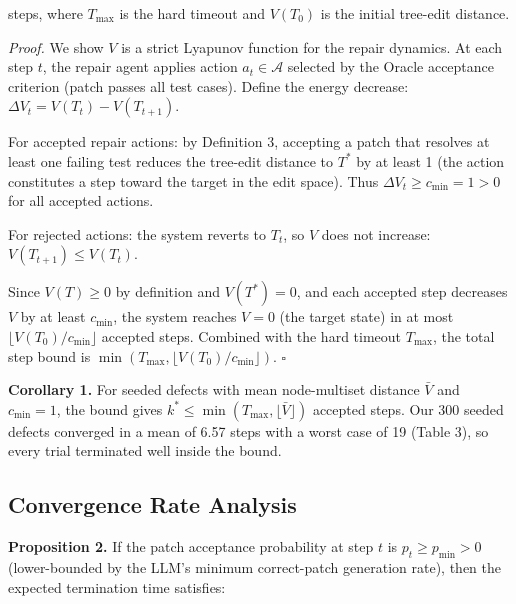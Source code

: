\documentclass[10pt,twocolumn,letterpaper]{article}
\begin{document}
steps, where $T_{\max}$ is the hard timeout and $V(T_0)$ is the initial tree-edit distance.

\textit{Proof.} We show $V$ is a strict Lyapunov function for the repair dynamics. At each step $t$, the repair agent applies action $a_t \in \mathcal{A}$ selected by the Oracle acceptance criterion (patch passes all test cases). Define the energy decrease: $\Delta V_t = V(T_t) - V(T_{t+1})$.

For accepted repair actions: by Definition 3, accepting a patch that resolves at least one failing test reduces the tree-edit distance to $T^*$ by at least 1 (the action constitutes a step toward the target in the edit space). Thus $\Delta V_t \geq c_{\min} = 1 > 0$ for all accepted actions.

For rejected actions: the system reverts to $T_t$, so $V$ does not increase: $V(T_{t+1}) \leq V(T_t)$.

Since $V(T) \geq 0$ by definition and $V(T^*) = 0$, and each accepted step decreases $V$ by at least $c_{\min}$, the system reaches $V = 0$ (the target state) in at most $\lfloor V(T_0)/c_{\min} \rfloor$ accepted steps. Combined with the hard timeout $T_{\max}$, the total step bound is $\min(T_{\max}, \lfloor V(T_0)/c_{\min} \rfloor)$. $\square$

\textbf{Corollary 1.} For seeded defects with mean node-multiset distance $\bar{V}$ and $c_{\min} = 1$, the bound gives $k^* \leq \min(T_{\max}, \lfloor \bar{V} \rfloor)$ accepted steps. Our 300 seeded defects converged in a mean of 6.57 steps with a worst case of 19 (Table 3), so every trial terminated well inside the bound.


\subsection{Convergence Rate Analysis}


\textbf{Proposition 2.} If the patch acceptance probability at step $t$ is $p_t \geq p_{\min} > 0$ (lower-bounded by the LLM's minimum correct-patch generation rate), then the expected termination time satisfies:
\end{document}
